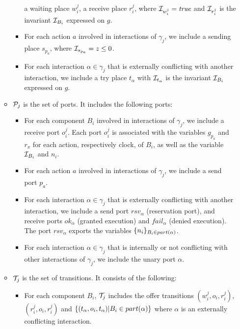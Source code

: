 \begin{definition}[Scheduler]
\begin{itemize}
\begin{itemize}
\begin{itemize}
            a waiting place $w_i^j$, a receive place $r_i^j$, where $\mathcal{I}_{w_i^j}=\textnormal{\textit{true}}$
            and $\mathcal{I}_{r_i^j}$ is the invariant $\mathcal{I}_{B_i}$ expressed on $g$.
          \item For each action $a$ involved in interactions of $\gamma_j$, we include a sending
            place $s_{p_a}$, where $\mathcal{I}_{s_{p_a}}=z\le0$.
          \item For each interaction $\alpha\in\gamma_j$ that is externally conflicting 
            with another interaction, we include a try place $t_{\alpha}$ with 
            $\mathcal{I}_{t_{\alpha}}$ is the invariant $\mathcal{I}_{B_i}$ expressed on $g$.
        \end{itemize}
        \item $\mathcal{P}_j$ is the set of ports. It includes the following ports:
          \begin{itemize}
            \item For each component $B_i$ involved in interactions of $\gamma_j$, we include
              a receive port $o_i^j$. Each port $o_i^j$ is associated with the variables
              $g_{p_a}$ and $r_x$ for each action, respectively clock, of $B_i$, as well
              as the variable $\mathcal{I}_{B_i}$ and $n_i$.
            \item For each action $a$ involved in interactions of $\gamma_j$, we include 
              a send port $p_a$.
            \item For each interaction $\alpha\in\gamma_j$ that is externally conflicting with
              another interaction, we include a send port $rsv_{\alpha}$ (reservation port), 
              and receive ports $ok_{\alpha}$ (granted execution) and $fail_{\alpha}$ (denied 
              execution). The port $rsv_{\alpha}$ exports the variables $\{n_i\}_{B_i
              \in part(\alpha)}$.
            \item For each interaction $\alpha\in\gamma_j$ that is internally or not conflicting
              with other interactions of $\gamma_j$, we include the unary port $\alpha$.
          \end{itemize}
        \item $\mathcal{T}_j$ is the set of transitions. It consists of the following:
          \begin{itemize}
            \item For each component $B_i$, $\mathcal{T}_j$ includes the offer transitions 
              $(w_i^j,o_i,r_i^j)$, $(r_i^j,o_i,r_i^j)$ and $\{(t_{\alpha},o_i,t_{\alpha})|
              B_i\in part(\alpha)\}$ where $\alpha$ is an externally conflicting interaction.

\end{itemize}
\end{itemize}
\end{itemize}
\end{definition}
